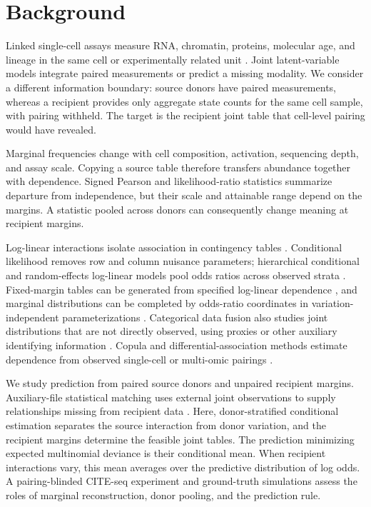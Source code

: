 \documentclass[pdflatex,sn-vancouver-num,iicol]{sn-jnl}
\begin{document}
\section{Background}

Linked single-cell assays measure RNA, chromatin, proteins, molecular age, and lineage in the same cell or experimentally related unit \cite{papalexi2021,frangieh2021,totalvi2021,multivi2023,perturbsci2023,resistrace2024}. Joint latent-variable models integrate paired measurements or predict a missing modality. We consider a different information boundary: source donors have paired measurements, whereas a recipient provides only aggregate state counts for the same cell sample, with pairing withheld. The target is the recipient joint table that cell-level pairing would have revealed.

Marginal frequencies change with cell composition, activation, sequencing depth, and assay scale. Copying a source table therefore transfers abundance together with dependence. Signed Pearson and likelihood-ratio statistics summarize departure from independence, but their scale and attainable range depend on the margins. A statistic pooled across donors can consequently change meaning at recipient margins.

Log-linear interactions isolate association in contingency tables \cite{goodman1970,goodman1979,egozcue2015,facevicova2016}. Conditional likelihood removes row and column nuisance parameters; hierarchical conditional and random-effects log-linear models pool odds ratios across observed strata \cite{mantel1959,liao1999,coullagresti2003,stijnen2010}. Fixed-margin tables can be generated from specified log-linear dependence \cite{hammond2024}, and marginal distributions can be completed by odds-ratio coordinates in variation-independent parameterizations \cite{evansdidelez2024}. Categorical data fusion also studies joint distributions that are not directly observed, using proxies or other auxiliary identifying information \cite{zhang2015fusion}. Copula and differential-association methods estimate dependence from observed single-cell or multi-omic pairings \cite{ma2023,diffcoex2010,dgca2016,schot2020}.

We study prediction from paired source donors and unpaired recipient margins. Auxiliary-file statistical matching uses external joint observations to supply relationships missing from recipient data \cite{moretti2023}. Here, donor-stratified conditional estimation separates the source interaction from donor variation, and the recipient margins determine the feasible joint tables. The prediction minimizing expected multinomial deviance is their conditional mean. When recipient interactions vary, this mean averages over the predictive distribution of log odds. A pairing-blinded CITE-seq experiment and ground-truth simulations assess the roles of marginal reconstruction, donor pooling, and the prediction rule.
\end{document}
